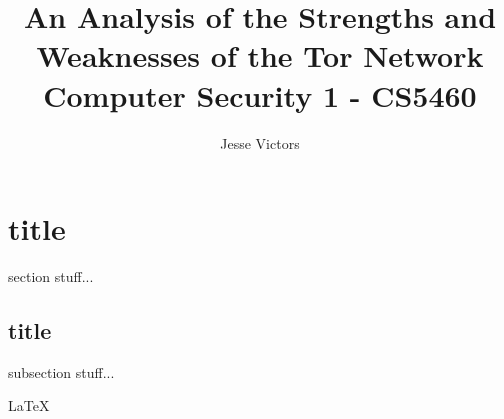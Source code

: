 \documentclass[journal]{IEEEtran}
\begin{document}
\title{An Analysis of the Strengths and Weaknesses of the Tor Network \\ \Large Computer Security 1 - CS5460}
\author{Jesse Victors}

\maketitle

\section{title}

section stuff...

\subsection{title}

subsection stuff...

\LaTeX{}
\end{document}
